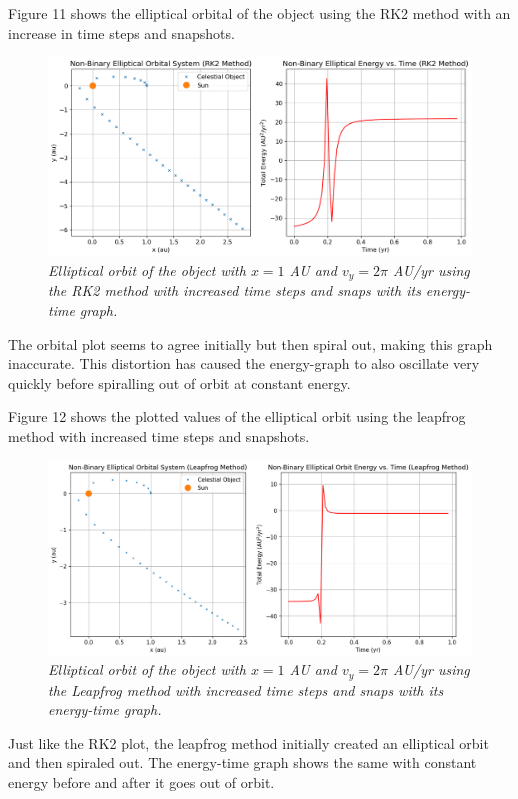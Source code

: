 \documentclass[11 pt, a4paper]{article}
\begin{document}
Figure 11 shows the elliptical orbital of the object using the RK2 method with an increase in time steps and snapshots.
\begin{figure}[H]
  \includegraphics[width=1\linewidth]{RK2/rk2ellipticincrease.png}
  \centering
  \caption{\textit{Elliptical orbit of the object with $x = 1$ AU and $v_y = 2\pi$ AU/yr using the RK2 method with increased time steps and snaps with its energy-time graph.}} 
\end{figure}
The orbital plot seems to agree initially but then spiral out, making this graph inaccurate. This distortion has caused the energy-graph to also oscillate very quickly before spiralling out of orbit at constant energy.

Figure 12 shows the plotted values of the elliptical orbit using the leapfrog method with increased time steps and snapshots.
\begin{figure}[H]
  \includegraphics[width=1\linewidth]{Leapfrog/leapfrogellipticincrease.png}
  \centering
  \caption{\textit{Elliptical orbit of the object with $x = 1$ AU and $v_y = 2\pi$ AU/yr using the Leapfrog method with increased time steps and snaps with its energy-time graph.}} 
\end{figure}
Just like the RK2 plot, the leapfrog method initially created an elliptical orbit and then spiraled out. The energy-time graph shows the same with constant energy before and after it goes out of orbit.
\end{document}
